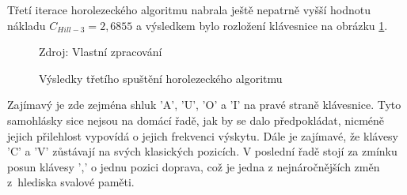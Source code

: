 \documentclass[a4paper, twoside, 12pt, czech]{article}
\begin{document}
Třetí iterace horolezeckého algoritmu nabrala ještě nepatrně vyšší hodnotu nákladu 
$C_{Hill-3}=2,6855$ a výsledkem bylo rozložení klávesnice na obrázku \ref{pic:hcfinal}.
\begin{figure}[h]
    \centering
    \caption{Výsledky třetího spuštění horolezeckého algoritmu}
    \vspace{0.5cm}
    \begin{keyboardlayout}
                     
        \newrow
        
                     
        \newrow
        
                    
        \newrow
        
                   
        \newrow
        
               
    \end{keyboardlayout}
    \small{Zdroj: Vlastní zpracování}
    \label{pic:hcfinal}
\end{figure}

Zajímavý je zde zejména shluk 'A', 'U', 'O' a 'I' na pravé straně klávesnice. Tyto samohlásky 
sice nejsou na domácí řadě, jak by se dalo předpokládat, nicméně jejich přilehlost 
vypovídá o jejich frekvenci výskytu. Dále je zajímavé, že klávesy 'C' a 'V' zůstávají 
na svých klasických pozicích. V poslední řadě stojí za zmínku posun klávesy ',' o 
jednu pozici doprava, což je jedna z nejnáročnějších změn z~hlediska svalové 
paměti.
\end{document}
